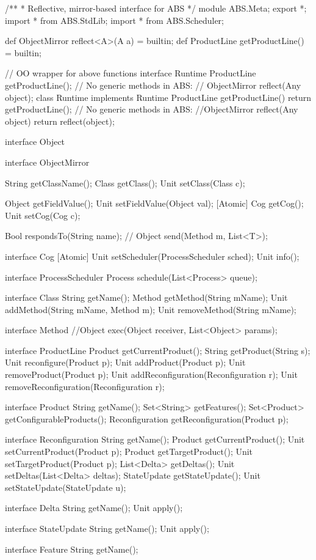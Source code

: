 \begin{abscode}
/**
 * Reflective, mirror-based interface for ABS
 */
module ABS.Meta;
export *;
import * from ABS.StdLib;
import * from ABS.Scheduler;

def ObjectMirror reflect<A>(A a) = builtin;
def ProductLine getProductLine() = builtin;

// OO wrapper for above functions
interface Runtime {
    ProductLine getProductLine();   
    // No generic methods in ABS:
    // ObjectMirror reflect(Any object);
}
class Runtime implements Runtime {
    ProductLine getProductLine() { return getProductLine(); }
    // No generic methods in ABS:
    //ObjectMirror reflect(Any object) { return reflect(object); }
}

interface Object {}

interface ObjectMirror {
    String getClassName();
    Class getClass();
    Unit setClass(Class c);
    
    Object getFieldValue();
    Unit setFieldValue(Object val);
    [Atomic] Cog getCog();
    Unit setCog(Cog c);
    
    Bool respondsTo(String name);
//    Object send(Method m, List<T>);
}

interface Cog {
    [Atomic] Unit setScheduler(ProcessScheduler sched);
    Unit info();
}

interface ProcessScheduler {
    Process schedule(List<Process> queue);
}

interface Class {
    String getName();
    Method getMethod(String mName);
    Unit addMethod(String mName, Method m);
    Unit removeMethod(String mName);
}

interface Method {
    //Object exec(Object receiver, List<Object> params);
}

interface ProductLine {
    Product getCurrentProduct();
    String getProduct(String s);
    Unit reconfigure(Product p);
    Unit addProduct(Product p);
    Unit removeProduct(Product p);
    Unit addReconfiguration(Reconfiguration r);   
    Unit removeReconfiguration(Reconfiguration r);   
}

interface Product {
    String getName();
    Set<String> getFeatures();
    Set<Product> getConfigurableProducts();
    Reconfiguration getReconfiguration(Product p);
}

interface Reconfiguration {
    String getName();
    Product getCurrentProduct();
    Unit setCurrentProduct(Product p);
    Product getTargetProduct();
    Unit setTargetProduct(Product p);
    List<Delta> getDeltas();
    Unit setDeltas(List<Delta> deltas);
    StateUpdate getStateUpdate();
    Unit setStateUpdate(StateUpdate u);
}

interface Delta {
    String getName();
    Unit apply();
}

interface StateUpdate {
    String getName();
    Unit apply();
}

interface Feature {
    String getName();
}

\end{abscode}

